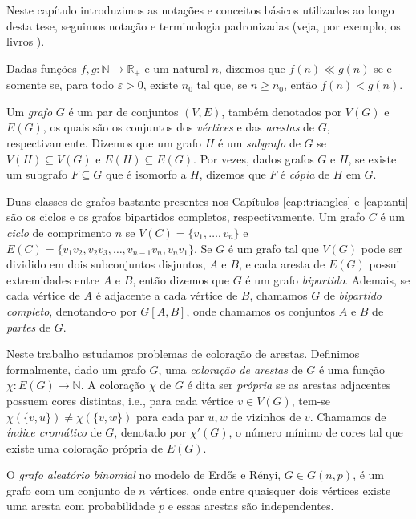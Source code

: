 \documentclass[12pt,a4paper]{book}
\let\epsilon\varepsilon
\begin{document}
Neste capítulo introduzimos as notações e conceitos básicos utilizados ao longo desta tese, seguimos notação e terminologia padronizadas (veja, por exemplo, os livros \cite{diestel10:_graph_theor, janson00:_random_graph}).

Dadas funções $f, g : \mathbb{N} \rightarrow \mathbb{R}_+$ e um natural $n$, dizemos que $f(n) \ll g(n)$
se e somente se, para
todo $\epsilon > 0$, existe $n_0$ tal que, se $n \geq n_0$, então $f(n) < g(n)$.

Um \textit{grafo} $G$ é um par de conjuntos $(V,E)$, também denotados por $V(G)$ e $E(G)$, os quais são
os conjuntos dos \textit{vértices} e das \textit{arestas} de $G$, respectivamente.
Dizemos que um grafo $H$ é um \textit{subgrafo} de $G$
se $V(H) \subseteq V(G)$ e $E(H) \subseteq E(G)$. 
Por vezes, dados grafos $G$ e $H$, se existe um subgrafo $F\subseteq G$ que é isomorfo a $H$, dizemos que $F$ é \textit{cópia} de $H$ em $G$. 

Duas classes de grafos bastante presentes nos Capítulos \ref{cap:triangles} e \ref{cap:anti} são os ciclos e os grafos bipartidos completos, respectivamente.
Um grafo $C$ é um \textit{ciclo} de comprimento $n$ se ${V(C)=\{v_1, \ldots, v_n\}}$ e $E(C) = \{v_1v_2, v_2v_3,\ldots, v_{n-1}v_n, v_nv_1\}$.
Se $G$ é um grafo tal que $V(G)$ pode ser dividido em dois subconjuntos disjuntos, $A$ e $B$, e cada
aresta de $E(G)$ possui extremidades entre $A$ e $B$, então dizemos que $G$ é um grafo \textit{bipartido}. 
Ademais, se cada vértice de $A$ é adjacente a cada vértice de $B$, chamamos $G$ de \textit{bipartido completo}, denotando-o por $G[A,B]$, onde chamamos os conjuntos $A$ e $B$ de \textit{partes} de $G$.

Neste trabalho estudamos problemas de coloração de arestas. 
Definimos formalmente, dado um grafo $G$, uma \textit{coloração de arestas} de $G$ é uma função $\chi: E(G) \rightarrow \mathbb{N}$. 
A coloração $\chi$ de $G$ é dita ser \textit{própria} se as arestas adjacentes possuem cores distintas, i.e., para cada vértice $v \in V(G)$, tem-se $\chi(\{v,u\}) \neq \chi(\{v,w\})$ para cada par $u,w$ de vizinhos de $v$.
Chamamos de \textit{índice cromático} de $G$, denotado por $\chi'(G)$, o número mínimo de cores tal que existe uma coloração própria de $E(G)$.

O \textit{grafo aleatório binomial} no modelo de Erd\H{o}s e Rényi, $G \in G(n, p)$, é um grafo com um conjunto de $n$ vértices, onde entre quaisquer dois vértices existe uma aresta com probabilidade $p$ e essas arestas são independentes.
\end{document}
